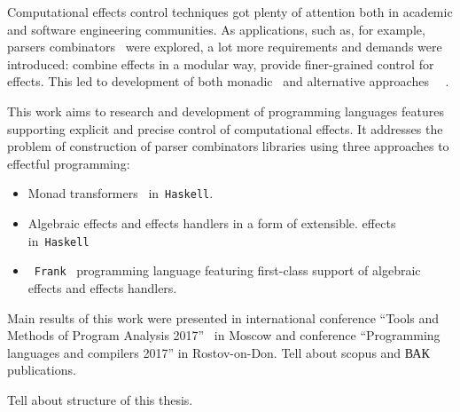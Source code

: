 Computational effects control techniques got plenty of attention both in academic and software engineering communities. As applications, such as, for example, parsers combinators~\cite{monParsing} were explored, a lot more requirements and demands
were introduced: combine effects in a modular way, provide finer-grained control
for effects. This led to development of both monadic~\cite{Liang:1995:MTM:199448.199528} and alternative approaches~\cite{Mcbride:2008:APE:1348940.1348941}
~\cite{DBLP:journals/jlp/BauerP15}.

This work aims to research and development of programming languages features supporting explicit and precise control of computational effects. It addresses the problem
of construction of parser combinators libraries using three approaches to
effectful programming:

\begin{itemize}
  \item Monad transformers~\cite{Liang:1995:MTM:199448.199528} in~\texttt{Haskell}.
  \item Algebraic effects and effects handlers in a form of extensible.
  effects~\cite{Kiselyov:2013:EEA:2578854.2503791} in~\texttt{Haskell}
  \item~\texttt{Frank}~\cite{DBLP:conf/popl/LindleyMM17} programming language featuring first-class support of algebraic
  effects and effects handlers.
\end{itemize}

Main results of this work were presented in  international conference ``Tools and Methods of Program Analysis 2017''~\cite{tmpa} in Moscow and conference
``Programming languages and compilers 2017'' in Rostov-on-Don.
Tell about scopus and ВАК publications.

Tell about structure of this thesis.

